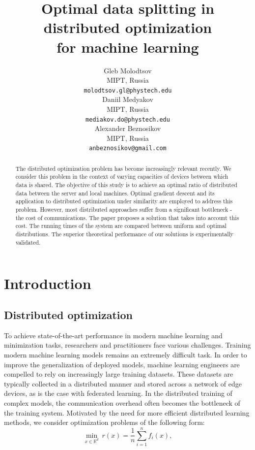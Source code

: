 \documentclass{article}
\title{Optimal data splitting in distributed optimization \\for machine learning}
\author{Gleb Molodtsov
    \\
	MIPT, Russia\\
	\texttt{molodtsov.gl@phystech.edu} \\
	\And
	Daniil Medyakov \\
	MIPT, Russia\\
	\texttt{mediakov.do@phystech.edu} \\
 \And
	Alexander Beznosikov \\
	MIPT, Russia\\
	\texttt{anbeznosikov@gmail.com} \\
}
\date{}
\begin{document}
\maketitle

\begin{abstract}
The distributed optimization problem has become increasingly relevant recently. We consider this problem in the context of varying capacities of devices between which data is shared. The objective of this study is to achieve an optimal ratio of distributed data between the server and local machines. Optimal gradient descent and its application to distributed optimization under similarity are employed to address this problem. However, most distributed approaches suffer from a significant bottleneck - the cost of communications. The paper proposes a solution that takes into account this cost. The running times of the system are compared between uniform and optimal distributions. The superior theoretical performance of our solutions is experimentally validated.
\end{abstract}




\section{Introduction}

\subsection{Distributed optimization}

To achieve state-of-the-art performance in modern machine learning and minimization tasks, researchers and practitioners face various challenges. Training modern machine learning models remains an extremely difficult task. In order to improve the generalization of deployed models, machine learning engineers are compelled to rely on increasingly large training datasets. These datasets are typically collected in a distributed manner and stored across a network of edge devices, as is the case with federated learning. In the distributed training of complex models, the communication overhead often becomes the bottleneck of the training system. Motivated by the need for more efficient distributed learning methods, we consider optimization problems of the following form:
\begin{equation}
    \label{eq:1}
    \underset{x\in \mathbb{R}^d}{\min} ~ r(x) = \frac{1}{n} \sum \limits_{i = 1}^{n} f _i(x),
\end{equation}
\end{document}
